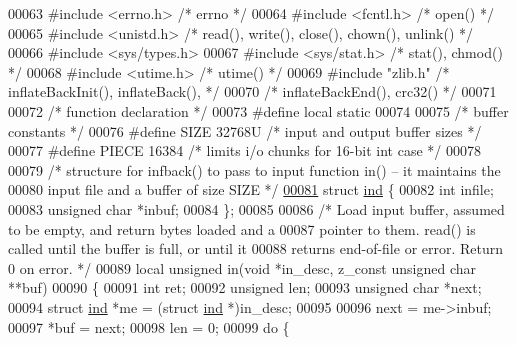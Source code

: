 \begin{DoxyCode}
00063 \textcolor{preprocessor}{#include <errno.h>}          \textcolor{comment}{/* errno */}
00064 \textcolor{preprocessor}{#include <fcntl.h>}          \textcolor{comment}{/* open() */}
00065 \textcolor{preprocessor}{#include <unistd.h>}         \textcolor{comment}{/* read(), write(), close(), chown(), unlink() */}
00066 \textcolor{preprocessor}{#include <sys/types.h>}
00067 \textcolor{preprocessor}{#include <sys/stat.h>}       \textcolor{comment}{/* stat(), chmod() */}
00068 \textcolor{preprocessor}{#include <utime.h>}          \textcolor{comment}{/* utime() */}
00069 \textcolor{preprocessor}{#include "zlib.h"}           \textcolor{comment}{/* inflateBackInit(), inflateBack(), */}
00070                             \textcolor{comment}{/* inflateBackEnd(), crc32() */}
00071 
00072 \textcolor{comment}{/* function declaration */}
00073 \textcolor{preprocessor}{#define local static}
00074 
00075 \textcolor{comment}{/* buffer constants */}
00076 \textcolor{preprocessor}{#define SIZE 32768U         }\textcolor{comment}{/* input and output buffer sizes */}\textcolor{preprocessor}{}
00077 \textcolor{preprocessor}{#define PIECE 16384         }\textcolor{comment}{/* limits i/o chunks for 16-bit int case */}\textcolor{preprocessor}{}
00078 
00079 \textcolor{comment}{/* structure for infback() to pass to input function in() -- it maintains the}
00080 \textcolor{comment}{   input file and a buffer of size SIZE */}
\hyperlink{structind}{00081} \textcolor{keyword}{struct }\hyperlink{structind}{ind} \{
00082     \textcolor{keywordtype}{int} infile;
00083     \textcolor{keywordtype}{unsigned} \textcolor{keywordtype}{char} *inbuf;
00084 \};
00085 
00086 \textcolor{comment}{/* Load input buffer, assumed to be empty, and return bytes loaded and a}
00087 \textcolor{comment}{   pointer to them.  read() is called until the buffer is full, or until it}
00088 \textcolor{comment}{   returns end-of-file or error.  Return 0 on error. */}
00089 local \textcolor{keywordtype}{unsigned} in(\textcolor{keywordtype}{void} *in\_desc, z\_const \textcolor{keywordtype}{unsigned} \textcolor{keywordtype}{char} **buf)
00090 \{
00091     \textcolor{keywordtype}{int} ret;
00092     \textcolor{keywordtype}{unsigned} len;
00093     \textcolor{keywordtype}{unsigned} \textcolor{keywordtype}{char} *next;
00094     \textcolor{keyword}{struct }\hyperlink{structind}{ind} *me = (\textcolor{keyword}{struct }\hyperlink{structind}{ind} *)in\_desc;
00095 
00096     next = me->inbuf;
00097     *buf = next;
00098     len = 0;
00099     \textcolor{keywordflow}{do} \{

\end{DoxyCode}
